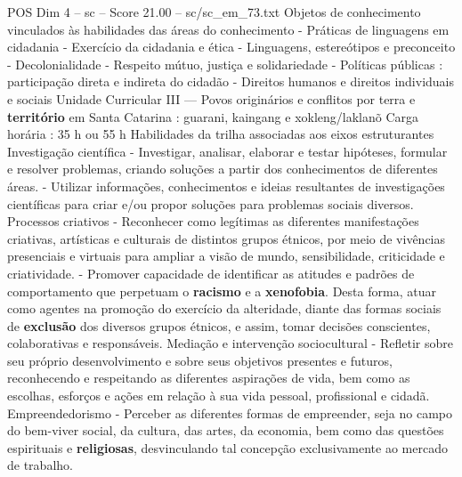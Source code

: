 \begin{textsample}{POS Dim 4 – sc – Score 21.00 – sc/sc\_em\_73.txt}
Objetos de conhecimento vinculados às habilidades das áreas do conhecimento - Práticas de linguagens em cidadania - Exercício da cidadania e ética - Linguagens, estereótipos e preconceito - Decolonialidade - Respeito mútuo, justiça e solidariedade - Políticas públicas : participação direta e indireta do cidadão - Direitos humanos e direitos individuais e sociais Unidade Curricular III — Povos originários e conflitos por terra e \textbf{território} em Santa Catarina : guarani, kaingang e xokleng/laklanõ Carga horária : 35 h ou 55 h Habilidades da trilha associadas aos eixos estruturantes Investigação científica - Investigar, analisar, elaborar e testar hipóteses, formular e resolver problemas, criando soluções a partir dos conhecimentos de diferentes áreas. - Utilizar informações, conhecimentos e ideias resultantes de investigações científicas para criar e/ou propor soluções para problemas sociais diversos.
Processos criativos - Reconhecer como legítimas as diferentes manifestações criativas, artísticas e culturais de distintos grupos étnicos, por meio de vivências presenciais e virtuais para ampliar a visão de mundo, sensibilidade, criticidade e criatividade. - Promover capacidade de identificar as atitudes e padrões de comportamento que perpetuam o \textbf{racismo} e a \textbf{xenofobia}.
Desta forma, atuar como agentes na promoção do exercício da alteridade, diante das formas sociais de \textbf{exclusão} dos diversos grupos étnicos, e assim, tomar decisões conscientes, colaborativas e responsáveis.
Mediação e intervenção sociocultural - Refletir sobre seu próprio desenvolvimento e sobre seus objetivos presentes e futuros, reconhecendo e respeitando as diferentes aspirações de vida, bem como as escolhas, esforços e ações em relação à sua vida pessoal, profissional e cidadã.
Empreendedorismo - Perceber as diferentes formas de empreender, seja no campo do bem-viver social, da cultura, das artes, da economia, bem como das questões espirituais e \textbf{religiosas}, desvinculando tal concepção exclusivamente ao mercado de trabalho.

\end{textsample}
